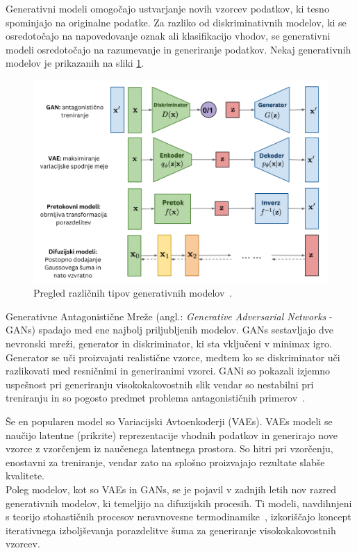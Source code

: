 \documentclass[12pt, a4paper]{article}
\begin{document}
Generativni modeli omogočajo ustvarjanje novih vzorcev podatkov, ki tesno spominjajo na originalne podatke. Za razliko od diskriminativnih modelov, ki se osredotočajo na napovedovanje oznak ali klasifikacijo vhodov, se generativni modeli osredotočajo na razumevanje in generiranje podatkov. Nekaj generativnih modelov je prikazanih na sliki \ref{fig:Generative models}.
\begin{figure}[htb!]
        \centering
        \includegraphics[width=0.8\linewidth]{Images_SLO/generative-overview_SLO.png}
        \caption{Pregled različnih tipov generativnih modelov~\cite{weng2021diffusion}.}
        \label{fig:Generative models}
\end{figure}

Generativne Antagonistične Mreže (angl.: \textit{Generative Adversarial Networks} - GANs) spadajo med ene najbolj priljubljenih modelov. GANs sestavljajo dve nevronski mreži, generator in diskriminator, ki sta vključeni v minimax igro. Generator se uči proizvajati realistične vzorce, medtem ko se diskriminator uči razlikovati med resničnimi in generiranimi vzorci. GANi so pokazali izjemno uspešnost pri generiranju visokokakovostnih slik vendar so nestabilni pri treniranju in so pogosto predmet problema antagonističnih primerov~\cite{antagonist}.

Še en popularen model so Variacijski Avtoenkoderji (VAEs). VAEs modeli se naučijo latentne (prikrite) reprezentacije vhodnih podatkov in generirajo nove vzorce z vzorčenjem iz naučenega latentnega prostora. So hitri pri vzorčenju, enostavni za treniranje, vendar zato na splošno proizvajajo rezultate slabše kvalitete. \\

Poleg modelov, kot so VAEs in GANs, se je pojavil v zadnjih letih nov razred generativnih modelov, ki temeljijo na difuzijskih procesih. Ti modeli, navdihnjeni s teorijo stohastičnih procesov neravnovesne termodinamike~\cite{nonequilibrium-thermodynamics}, izkoriščajo koncept iterativnega izboljševanja porazdelitve šuma za generiranje visokokakovostnih vzorcev.
\end{document}
